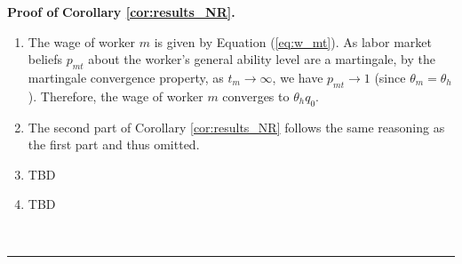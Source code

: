 \documentclass[12pt]{article}
\newenvironment{proof}[1][Proof of]{\noindent\textbf{#1} }{\ \rule{0.5em}{0.5em}}
\begin{document}
\begin{proof}
    \textbf{Corollary \ref{cor:results_NR}.}
    \begin{enumerate}[label={\roman*})]
        \item The wage of worker $m$ is given by Equation (\ref{eq:w_mt}). As labor market beliefs $p_{mt}$ about the worker's general ability level are a martingale, by the martingale convergence property, as $t_m \rightarrow \infty$, we have $p_{mt} \rightarrow 1$ (since $\theta_m = \theta_h$). Therefore, the wage of worker $m$ converges to $\theta_h q_0$.
        \item The second part of Corollary \ref{cor:results_NR} follows the same reasoning as the first part and thus omitted.
        \item TBD
        \item TBD

    \end{enumerate}
\end{proof}
\end{document}
